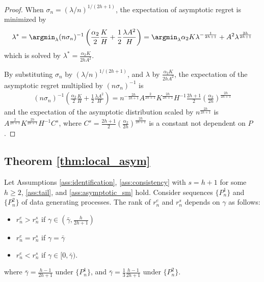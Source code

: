 {\begin{proof}
     When $\sigma_n = (\lambda/n)^{1/(2h +1)}$, the expectation of asymptotic regret is minimized by
     \begin{gather*}
         \lambda^* = \argmin_{\lambda} (n \sigma_n)^{-1} \left(\frac{\alpha_2}{2} \frac{ K}{H} + \frac{1}{2} \frac{\lambda A^2}{H} \right) = \argmin_{\lambda} \alpha_2 K \lambda^{-\frac{1}{2h+1}} + A^2 \lambda^{\frac{2h}{2h+1}}
     \end{gather*}
     which is solved by $\lambda^* = \frac{\alpha_2 K}{2hA^2 }$.

     By substituting $\sigma_n$ by $(\lambda/n)^{1/(2h +1)}$, and $\lambda$ by $ \frac{\alpha_2 K}{2hA^2 }$, the expectation of the asymptotic regret multiplied by $(n \sigma_n)^{-1}$ is
     \begin{gather*}
         (n \sigma_n)^{-1} \left(\frac{\alpha_2}{2} \frac{ K}{H} + \frac{1}{2} \frac{\lambda A^2}{H} \right) = n^{-\frac{2h}{2h+1}} A^{\frac{2}{2h+1}} K^{\frac{2h}{2h+1}} H^{-1} \frac{2h+1}{2} \left( \frac{\alpha_2}{2h} \right)^\frac{2h}{2h+1}
     \end{gather*}
     and the expectation of the asymptotic distribution scaled by $n^\frac{2h}{2h+1}$ is $A^{\frac{2}{2h+1}} K^{\frac{2h}{2h+1}} H^{-1} C^s$, where $C^s = \frac{2h+1}{2} \left( \frac{\alpha_2}{2h} \right)^\frac{2h}{2h+1}$ is a constant not dependent on $P$.
\end{proof}


\subsection*{Theorem \ref{thm:local_asym}}
\begin{thm} 
    Let Assumptions \ref{ass:identification}, \ref{ass:consistency} with $s=h + 1$ for some $h\geq 2$, \ref{ass:tail}, and \ref{ass:asymptotic_sm} hold.
    Consider  sequences $\{P^1_n\}$ and $\{P^2_n\}$ of data generating processes. The rank of $r_n^e$ and $r_n^s$ depends on $\gamma$ as follows:
    \begin{itemize}
    \item $r_n^e > r_n^s$ if $\gamma \in (\bar{\gamma},\frac{h}{2h + 1})$
    \item $r_n^e = r_n^s$ if $\gamma = \bar{\gamma} $
    \item $r_n^e < r_n^s$ if $\gamma \in [0,\bar{\gamma})$.
    \end{itemize}
    where $\bar{\gamma} = \frac{h-1}{2h + 1}$ under $\{P^1_n\}$, and $\bar{\gamma} = \frac{1}{3}\frac{h-1}{2h + 1}$ under $\{P^2_n\}$.
\end{thm}

}
